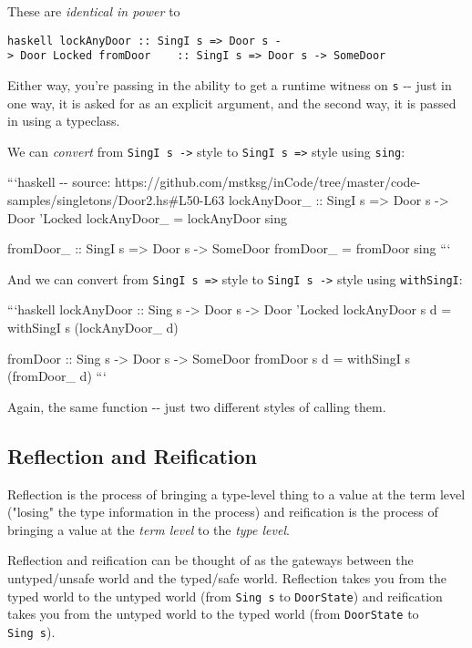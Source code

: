 \documentclass[]{article}
\begin{document}
These are \emph{identical in power} to

\texttt{haskell\ lockAnyDoor\ ::\ SingI\ s\ =\textgreater{}\ Door\ s\ -\textgreater{}\ Door\ \textquotesingle{}Locked\ fromDoor\ \ \ \ ::\ SingI\ s\ =\textgreater{}\ Door\ s\ -\textgreater{}\ SomeDoor}

Either way, you're passing in the ability to get a runtime witness on \texttt{s}
-\/- just in one way, it is asked for as an explicit argument, and the second
way, it is passed in using a typeclass.

We can \emph{convert} from \texttt{SingI\ s\ -\textgreater{}} style to
\texttt{SingI\ s\ =\textgreater{}} style using \texttt{sing}:

```haskell -\/- source:
https://github.com/mstksg/inCode/tree/master/code-samples/singletons/Door2.hs\#L50-L63
lockAnyDoor\_ :: SingI s =\textgreater{} Door s -\textgreater{} Door 'Locked
lockAnyDoor\_ = lockAnyDoor sing

fromDoor\_ :: SingI s =\textgreater{} Door s -\textgreater{} SomeDoor fromDoor\_
= fromDoor sing ```

And we can convert from \texttt{SingI\ s\ =\textgreater{}} style to
\texttt{SingI\ s\ -\textgreater{}} style using \texttt{withSingI}:

```haskell lockAnyDoor :: Sing s -\textgreater{} Door s -\textgreater{} Door
'Locked lockAnyDoor s d = withSingI s (lockAnyDoor\_ d)

fromDoor :: Sing s -\textgreater{} Door s -\textgreater{} SomeDoor fromDoor s d
= withSingI s (fromDoor\_ d) ```

Again, the same function -\/- just two different styles of calling them.

\subsection{Reflection and Reification}

Reflection is the process of bringing a type-level thing to a value at the term
level ("losing" the type information in the process) and reification is the
process of bringing a value at the \emph{term level} to the \emph{type level}.

Reflection and reification can be thought of as the gateways between the
untyped/unsafe world and the typed/safe world. Reflection takes you from the
typed world to the untyped world (from \texttt{Sing\ s} to \texttt{DoorState})
and reification takes you from the untyped world to the typed world (from
\texttt{DoorState} to \texttt{Sing\ s}).
\end{document}
